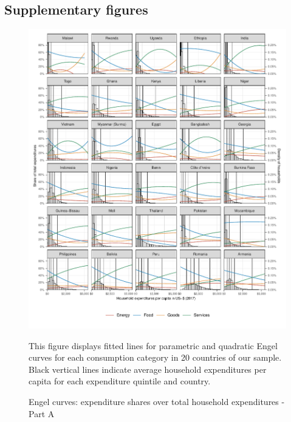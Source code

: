 \documentclass[12pt, a4paper]{article}
\newenvironment{subcaption}
{\strut
\vspace{-5pt}
\begin{minipage}[b]{0.9\textwidth}
  \hspace*{-\parindent}
  \footnotesize}
 {\end{minipage}}
\begin{document}
\renewcommand\thefigure{\thesection.\arabic{figure}}
\renewcommand\thetable{\thesection.\arabic{table}}
\setcounter{figure}{0}
\setcounter{table}{0}

\subsection{Supplementary figures} \label{sec:figures}

\begin{figure}[ht!]
  \centering
  \caption{Engel curves: expenditure shares over total household expenditures - Part A} \label{fig:A1}
  \includegraphics{Analysis_Parametric_Engel_Curves/Parametric_EC_0_A}
  \begin{subcaption}
    This figure displays fitted lines for parametric and quadratic Engel curves for each consumption category in 20 countries of our sample. Black vertical lines indicate average household expenditures per capita for each expenditure quintile and country.
  \end{subcaption}

\end{figure}
\end{document}
